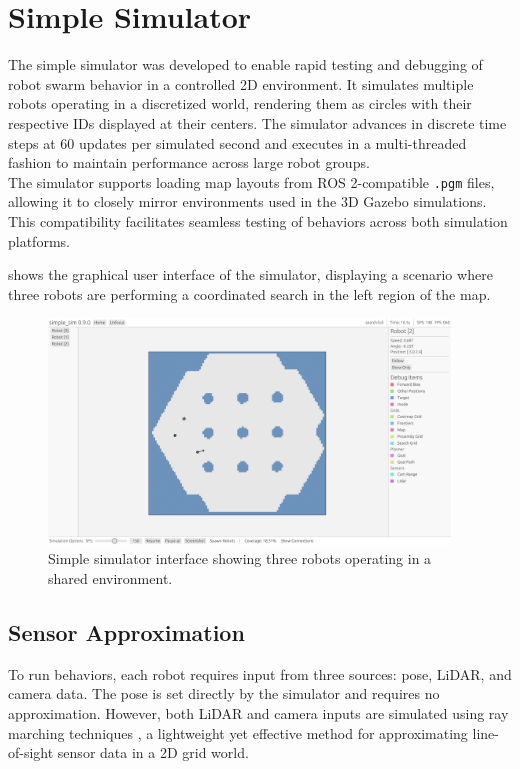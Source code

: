 \section{Simple Simulator}
\label{sec:simple-simulator}
The simple simulator was developed to enable rapid testing and debugging of robot swarm behavior in a controlled 2D environment. It simulates multiple robots operating in a discretized world, rendering them as circles with their respective IDs displayed at their centers. The simulator advances in discrete time steps at 60 updates per simulated second and executes in a multi-threaded fashion to maintain performance across large robot groups.\\

The simulator supports loading map layouts from ROS 2-compatible \texttt{.pgm} files, allowing it to closely mirror environments used in the 3D Gazebo simulations. This compatibility facilitates seamless testing of behaviors across both simulation platforms.

 shows the graphical user interface of the simulator, displaying a scenario where three robots are performing a coordinated search in the left region of the map.

\begin{figure}[H]
    \begin{center}
        \includegraphics[width=0.95\textwidth]{figures/simple-sim-gui.png}
    \end{center}
    \caption{Simple simulator interface showing three robots operating in a shared environment.}
    \label{fig:simple-sim-interface}
\end{figure}

\subsection{Sensor Approximation}
To run behaviors, each robot requires input from three sources: pose, LiDAR, and camera data. The pose is set directly by the simulator and requires no approximation. However, both LiDAR and camera inputs are simulated using ray marching techniques \cite{raymarching}, a lightweight yet effective method for approximating line-of-sight sensor data in a 2D grid world.

